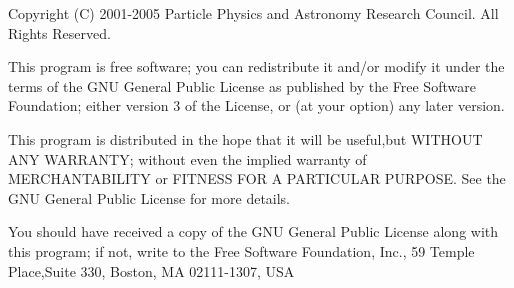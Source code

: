 Copyright (C) 2001-2005 Particle Physics and Astronomy Research
Council. All Rights Reserved.



This program is free software; you can redistribute it and/or modify it under
the terms of the GNU General Public License as published by the Free Software
Foundation; either version 3 of the License, or (at your option) any later
version.



This program is distributed in the hope that it will be useful,but WITHOUT ANY
WARRANTY; without even the implied warranty of MERCHANTABILITY or FITNESS FOR A
PARTICULAR PURPOSE. See the GNU General Public License for more details.



You should have received a copy of the GNU General Public License along with
this program; if not, write to the Free Software Foundation, Inc., 59 Temple
Place,Suite 330, Boston, MA  02111-1307, USA

